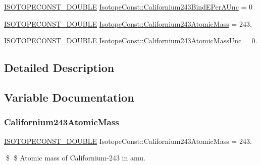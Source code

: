 \begin{DoxyCompactItemize}
\mbox{\hyperlink{group___isotope_const-_macros_ga8f45a7272ce02c0b4c65c44636ed719a}{I\+S\+O\+T\+O\+P\+E\+C\+O\+N\+S\+T\+\_\+\+D\+O\+U\+B\+LE}} \mbox{\hyperlink{group___isotope_const-_californium-_cf243_ga9d26c6e93dfd49e57ea16e9481c444d4}{Isotope\+Const\+::\+Californium243\+Bind\+E\+Per\+A\+Unc}} = 0
\item 
\mbox{\hyperlink{group___isotope_const-_macros_ga8f45a7272ce02c0b4c65c44636ed719a}{I\+S\+O\+T\+O\+P\+E\+C\+O\+N\+S\+T\+\_\+\+D\+O\+U\+B\+LE}} \mbox{\hyperlink{group___isotope_const-_californium-_cf243_gadb3108f135c543d3e9d410f18f330b46}{Isotope\+Const\+::\+Californium243\+Atomic\+Mass}} = 243.
\item 
\mbox{\hyperlink{group___isotope_const-_macros_ga8f45a7272ce02c0b4c65c44636ed719a}{I\+S\+O\+T\+O\+P\+E\+C\+O\+N\+S\+T\+\_\+\+D\+O\+U\+B\+LE}} \mbox{\hyperlink{group___isotope_const-_californium-_cf243_gaa3bf80f48c5ce13490731668c5662856}{Isotope\+Const\+::\+Californium243\+Atomic\+Mass\+Unc}} = 0.
\end{DoxyCompactItemize}


\subsection{Detailed Description}


\subsection{Variable Documentation}
\mbox{\label{group___isotope_const-_californium-_cf243_gadb3108f135c543d3e9d410f18f330b46}} 
\subsubsection{\texorpdfstring{Californium243\+Atomic\+Mass}{Californium243AtomicMass}}
{\footnotesize\ttfamily \mbox{\hyperlink{group___isotope_const-_macros_ga8f45a7272ce02c0b4c65c44636ed719a}{I\+S\+O\+T\+O\+P\+E\+C\+O\+N\+S\+T\+\_\+\+D\+O\+U\+B\+LE}} Isotope\+Const\+::\+Californium243\+Atomic\+Mass = 243.}

\$ \$ Atomic mass of Californium-\/243 in amu. \mbox{\label{group___isotope_const-_californium-_cf243_gaa3bf80f48c5ce13490731668c5662856}} 
